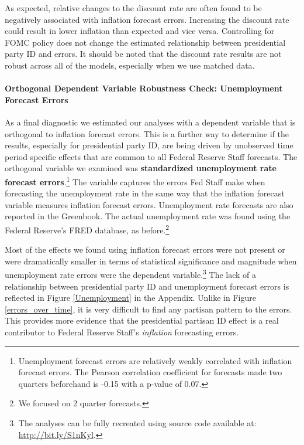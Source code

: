 \documentclass[a4paper]{article}\usepackage{graphicx, color}
\begin{document}
As expected, relative changes to the discount rate are often found to be negatively associated with inflation forecast errors. Increasing the discount rate could result in lower inflation than expected and vice versa. Controlling for FOMC policy does not change the estimated relationship between presidential party ID and errors. It should be noted that the discount rate results are not robust across all of the models, especially when we use matched data. 




\paragraph{Orthogonal Dependent Variable Robustness Check: Unemployment Forecast Errors}

As a final diagnostic we estimated our analyses with a dependent variable that is orthogonal to inflation forecast errors. This is a further way to determine if the results, especially for presidential party ID, are being driven by unobserved time period specific effects that are common to all Federal Reserve Staff forecasts. The orthogonal variable we examined was {\bf{standardized unemployment rate forecast errors}}.\footnote{Unemployment forecast errors are relatively weakly correlated with inflation forecast errors. The Pearson correlation coefficient for forecasts made two quarters beforehand is -0.15 with a p-value of 0.07.} The variable captures the errors Fed Staff make when forecasting the unemployment rate in the same way that the inflation forecast variable measures inflation forecast errors. Unemployment rate forecasts are also reported in the Greenbook. The actual unemployment rate was found using the Federal Reserve's FRED database, as before.\footnote{We focused on 2 quarter forecasts.}

Most of the effects we found using inflation forecast errors were not present or were dramatically smaller in terms of statistical significance and magnitude when unemployment rate errors were the dependent variable.\footnote{The analyses can be fully recreated using source code available at: \url{http://bit.ly/S1nKyl}.} The lack of a relationship between presidential party ID and unemployment forecast errors is reflected in Figure \ref{Unemployment} in the Appendix. Unlike in Figure \ref{errors_over_time}, it is very difficult to find any partisan pattern to the errors. This provides more evidence that the presidential partisan ID effect is a real contributor to Federal Reserve Staff's \emph{inflation} forecasting errors.
\end{document}

